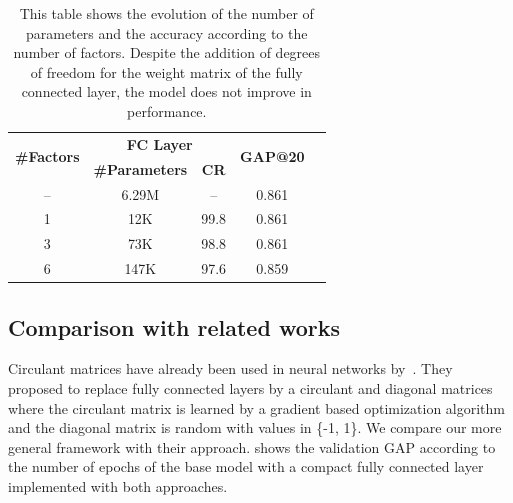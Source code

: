 \begin{table}[ht]
  \centering
  \begin{tabular}{ccccc}
    \toprule
    \multirow{2}{*}{\textbf{\#Factors}} & \multicolumn{2}{c}{\textbf{FC Layer}} & \multirow{2}{*}{\textbf{GAP@20}} \\
    \cmidrule{2-3}
     & \textbf{\#Parameters} & \textbf{CR} \\
    \midrule
    -- & 6.29M & -- & 0.861 \\
    1 & 12K & 99.8 & 0.861 \\
    3 & 73K & 98.8 & 0.861 \\
    6 & 147K & 97.6 & 0.859 \\
    \bottomrule
  \end{tabular}
  \caption{This table shows the evolution of the number of parameters and the accuracy according to the number of factors. Despite the addition of degrees of freedom for the weight matrix of the fully connected layer, the model does not improve in performance.}
  \label{table:ap2-factors}
\end{table}


\subsection{Comparison with related works}
\label{subsection:ap2-comparison_with_related_works}

Circulant matrices have already been used in neural networks by~\cite{cheng2015exploration}.
They proposed to replace fully connected layers by a circulant and diagonal matrices where the circulant matrix is learned by a gradient based optimization algorithm and the diagonal matrix is random with values in \{-1, 1\}.
We compare our more general framework with their approach.
 shows the validation GAP according to the number of epochs of the base model with a compact fully connected layer implemented with both approaches.

%   



